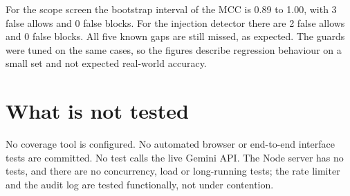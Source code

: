 For the scope screen the bootstrap interval of the MCC is 0.89 to 1.00, with 3 false allows and 0 false blocks. For the injection detector there are 2 false allows and 0 false blocks. All five known gaps are still missed, as expected. The guards were tuned on the same cases, so the figures describe regression behaviour on a small set and not expected real-world accuracy.

\section{What is not tested}
No coverage tool is configured. No automated browser or end-to-end interface tests are committed. No test calls the live Gemini API. The Node server has no tests, and there are no concurrency, load or long-running tests; the rate limiter and the audit log are tested functionally, not under contention.
